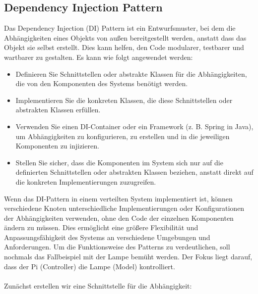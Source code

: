 \documentclass[../vs-script-first-v01.tex]{subfiles}
\begin{document}
\subsection{Dependency Injection Pattern}

Das Dependency Injection (DI) Pattern ist ein Entwurfsmuster, bei dem die Abhängigkeiten eines Objekts von außen bereitgestellt werden, anstatt dass das Objekt sie selbst erstellt. Dies kann helfen, den Code modularer, testbarer und wartbarer zu gestalten. Es kann wie folgt angewendet werden:
\begin{itemize}
\item Definieren Sie Schnittstellen oder abstrakte Klassen für die Abhängigkeiten, die von den Komponenten des Systems benötigt werden.
\item Implementieren Sie die konkreten Klassen, die diese Schnittstellen oder abstrakten Klassen erfüllen.
\item Verwenden Sie einen DI-Container oder ein Framework (z. B. Spring in Java), um Abhängigkeiten zu konfigurieren, zu erstellen und in die jeweiligen Komponenten zu injizieren.
\item Stellen Sie sicher, dass die Komponenten im System sich nur auf die definierten Schnittstellen oder abstrakten Klassen beziehen, anstatt direkt auf die konkreten Implementierungen zuzugreifen.
\end{itemize}    
Wenn das DI-Pattern in einem verteilten System implementiert ist, können verschiedene Knoten unterschiedliche Implementierungen oder Konfigurationen der Abhängigkeiten verwenden, ohne den Code der einzelnen Komponenten ändern zu müssen. Dies ermöglicht eine größere Flexibilität und Anpassungsfähigkeit des Systems an verschiedene Umgebungen und Anforderungen. 
Um die Funktionsweise des Patterns zu verdeutlichen, soll nochmals das Fallbeispiel mit der Lampe bemüht werden. Der Fokus liegt darauf, dass der Pi (Controller) die Lampe (Model) kontrolliert. 
\\\\
Zunächst erstellen wir eine Schnittstelle für die Abhängigkeit:\\
\end{document}
